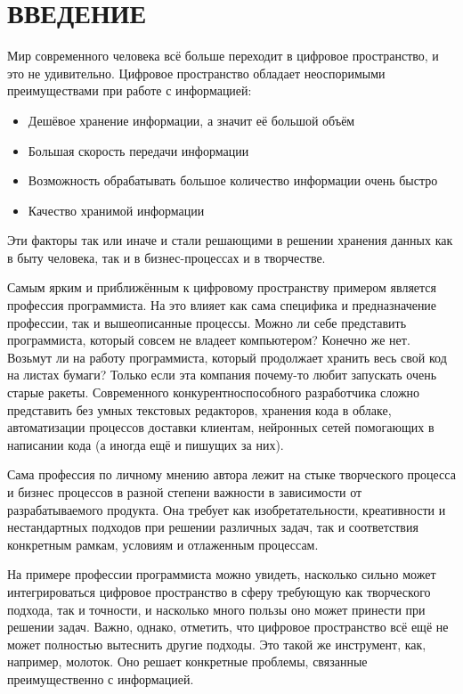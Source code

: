 \documentclass[14pt]{extarticle}
\begin{document}
\renewcommand{\contentsname}{\rucontentsname}
\tableofcontents

\section*[ВВЕДЕНИЕ]{ВВЕДЕНИЕ}

Мир современного человека всё больше переходит в цифровое пространство, и это не удивительно.
Цифровое пространство обладает неоспоримыми преимуществами при работе с информацией:

\begin{itemize}[label=$\bullet$]
	\item Дешёвое хранение информации, а значит её большой объём
	\item Большая скорость передачи информации
	\item Возможность обрабатывать большое количество информации очень быстро
	\item Качество хранимой информации
\end{itemize}

Эти факторы так или иначе и стали решающими
в решении хранения данных как в быту человека, так и в бизнес-процессах и в творчестве.

Самым ярким и приближённым к цифровому пространству примером является профессия программиста.
На это влияет как сама специфика и предназначение профессии, так и вышеописанные процессы.
Можно ли себе представить программиста, который совсем не владеет компьютером? 
Конечно же нет. Возьмут ли на работу программиста, который продолжает хранить весь свой 
код на листах бумаги? Только если эта компания почему-то любит запускать очень старые ракеты. 
Современного конкурентноспособного разработчика сложно представить без умных текстовых редакторов, 
хранения кода в облаке, автоматизации процессов доставки клиентам, нейронных сетей помогающих 
в написании кода (а иногда ещё и пишущих за них).

Сама профессия по личному мнению автора лежит на стыке творческого процесса и бизнес процессов 
в разной степени важности в зависимости от разрабатываемого продукта.
Она требует как изобретательности, креативности и нестандартных подходов при решении различных задач, 
так и соответствия конкретным рамкам, условиям и отлаженным процессам. 

На примере профессии программиста можно увидеть, насколько сильно может интегрироваться цифровое 
пространство в сферу требующую как творческого подхода, так и точности,
и насколько много пользы оно может принести при решении задач. Важно, однако, отметить, что
цифровое пространство всё ещё не может полностью вытеснить другие подходы. Это такой же инструмент, 
как, например, молоток. Оно решает конкретные проблемы, связанные преимущественно с информацией.
\end{document}

